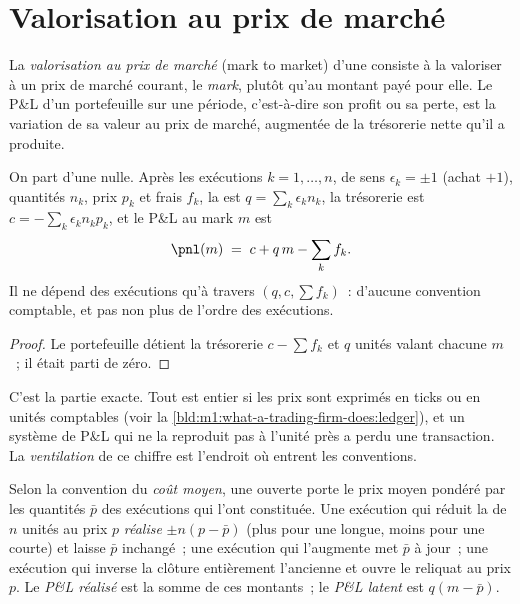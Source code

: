 \section{Valorisation au prix de marché}

\begin{definition}\label{def:m1:pnl-and-positions:mtm}
La \emph{valorisation au prix de marché} (mark to market) d'une  consiste à la valoriser à un prix de marché
courant, le \emph{mark}, plutôt qu'au montant payé pour elle.
Le P\&L d'un portefeuille sur une période, c'est-à-dire son profit ou sa perte, est la variation
de sa valeur au prix de marché, augmentée de la trésorerie nette qu'il a produite.
\end{definition}

\begin{proposition}[L'identité du P\&L]\label{prop:m1:pnl-and-positions:identity}
On part d'une  nulle. Après les exécutions $k = 1,\dots,n$, de sens $\epsilon_k = \pm1$ (achat
$+1$), quantités $n_k$, prix $p_k$ et frais $f_k$, la  est $q =
\sum_k \epsilon_k n_k$, la trésorerie est $c = -\sum_k \epsilon_k n_k p_k$, et le
P\&L au mark $m$ est
\[
\pnl(m) \;=\; c + q\,m - \sum_k f_k .
\]
Il ne dépend des exécutions qu'à travers $(q, c, \sum f_k)$~: d'aucune convention
comptable, et pas non plus de l'ordre des exécutions.
\end{proposition}
\begin{proof}
Le portefeuille détient la trésorerie $c - \sum f_k$ et $q$ unités valant chacune $m$~; il
était parti de zéro.
\end{proof}

C'est la partie exacte. Tout est entier si les prix sont exprimés en ticks ou en unités
comptables (voir la \cref{bld:m1:what-a-trading-firm-does:ledger}), et un système de P\&L
qui ne la reproduit pas à l'unité près a perdu une transaction. La
\emph{ventilation} de ce chiffre est l'endroit où entrent les conventions.

\begin{definition}\label{def:m1:pnl-and-positions:realised}
Selon la convention du \emph{coût moyen}, une  ouverte
porte le prix moyen pondéré par les quantités $\bar p$ des exécutions qui l'ont constituée.
Une exécution qui réduit la  de $n$ unités au prix $p$
\emph{réalise} $\pm n(p - \bar p)$ (plus pour une  longue, moins pour une  courte) et
laisse $\bar p$ inchangé~; une exécution qui l'augmente met $\bar p$ à jour~; une exécution
qui inverse la  clôture entièrement l'ancienne et ouvre le reliquat au
prix $p$. Le \emph{P\&L réalisé} est la somme de ces
montants~; le \emph{P\&L latent} est $q(m - \bar
p)$.
\end{definition}

